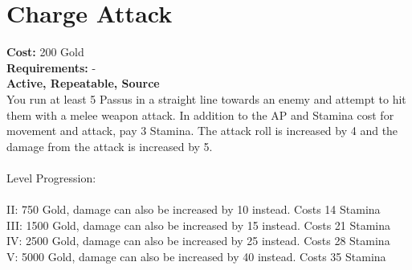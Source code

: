 \section*{Charge Attack}
\textbf{Cost:} 200 Gold\\
\textbf{Requirements:} -\\
\textbf{Active, Repeatable, Source}\\
You run at least 5 Passus in a straight line towards an enemy and attempt to hit them with a melee weapon attack. In addition to the AP and Stamina cost for movement and attack, pay 3 Stamina. The attack roll is increased by 4 and the damage from the attack is increased by 5.\\
\\
Level Progression:\\
\\
II: 750 Gold, damage can also be increased by 10 instead. Costs 14 Stamina\\
III: 1500 Gold, damage can also be increased by 15 instead. Costs 21 Stamina\\
IV: 2500 Gold, damage can also be increased by 25 instead. Costs 28 Stamina\\
V: 5000 Gold, damage can also be increased by 40 instead. Costs 35 Stamina\\